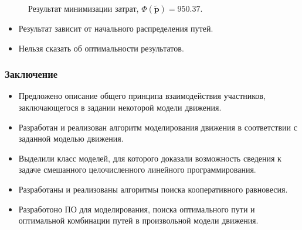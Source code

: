 \documentclass{beamer}
\begin{document}
\begin{frame}
\begin{figure}[H]
\begin{center}
\begin{minipage}[h]{0.35\linewidth}
			\caption{Результат минимизации затрат, $\Phi(\widetilde{\textbf{p}}) = 950.37$.}
		\end{minipage}
	\end{center}
\end{figure}

\begin{itemize}
	\item Результат зависит от начального распределения путей.
	\item Нельзя сказать об оптимальности результатов.
\end{itemize}

\end{frame}

\begin{frame}\frametitle{Заключение}
	\begin{itemize}
		\item Предложено описание общего принципа взаимодействия участников, заключающегося в задании некоторой модели движения.
		\item Разработан и реализован алгоритм моделирования движения в соответствии с заданной моделью движения.
		\item Выделили класс моделей, для которого доказали возможность сведения к задаче смешанного целочисленного линейного программирования.
		\item Разработаны и реализованы алгоритмы поиска кооперативного равновесия.
		\item Разработоно ПО для моделирования, поиска оптимального пути и оптимальной комбинации путей в произвольной модели движения.
	\end{itemize}
\end{frame}
\end{document}
